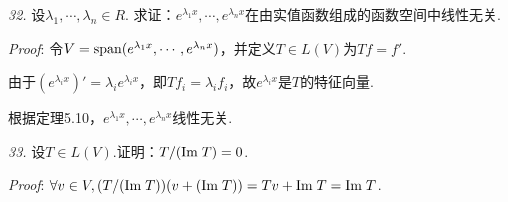 \hspace*{\fill}

\textit{32.}
设$\lambda_1,\cdots,\lambda_n \in R$.
求证：$e^{\lambda_1 x},\cdots,e^{\lambda_n x}$在由实值函数组成的函数空间中线性无关.

\textit{Proof}:
令$V=\mathrm{span} (e^{\lambda_1 x},\cdots,e^{\lambda_n x})$，并定义$T \in L(V)$为$Tf=f'$.

由于$(e^{\lambda_i x})'=\lambda_i e^{\lambda_i x}$，即$Tf_i=\lambda_i f_i$，故$e^{\lambda_i x}$是$T$的特征向量.

根据定理5.10，$e^{\lambda_1 x},\cdots,e^{\lambda_n x}$线性无关.

\hspace*{\fill}

\textit{33.}
设$T \in L(V)$.证明：$T/(\mathrm{Im \;} T)=0$.

\textit{Proof}:
$\forall v \in V,(T/(\mathrm{Im \;} T))(v+(\mathrm{Im \;} T))=Tv+\mathrm{Im \;} T=\mathrm{Im \;} T$.

